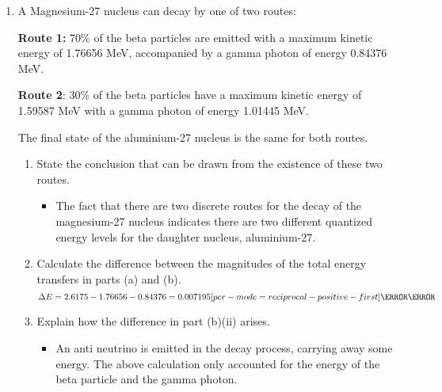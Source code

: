 \documentclass[a4paper,12pt]{article}
\let\oldsi\si
\renewcommand{\si}[1]{\oldsi[per-mode=reciprocal-positive-first]{#1}}
\begin{document}
\begin{enumerate}[resume*]
  \item A Magnesium-27 nucleus can decay by one of two routes:

        \textbf{Route 1:} 70\% of the beta particles are emitted with a maximum kinetic energy of
        1.76656 MeV, accompanied by a gamma photon of energy 0.84376 MeV.

        \textbf{Route 2}: 30\% of the beta particles have a maximum kinetic energy of 1.59587 MeV
        with a gamma photon of energy 1.01445 MeV.

        The final state of the aluminium-27 nucleus is the same for both routes.
        \begin{enumerate}[label=(\roman*)]
          \item State the conclusion that can be drawn from the existence of these two routes.
                \begin{itemize}
                  \item The fact that there are two discrete routes for the decay of the magnesium-27 nucleus indicates there are two different quantized energy levels for the daughter nucleus, aluminium-27.
                \end{itemize}
          \item Calculate the difference between the magnitudes of the total energy transfers in parts (a) and (b).
                $$\Delta E =2.6175 - 1.76656 - 0.84376 = 0.007195 \si{\mega\electronvolt}$$
          \item Explain how the difference in part (b)(ii) arises.
                \begin{itemize}
                  \item An anti neutrino is emitted in the decay process, carrying away some energy. The above calculation only accounted for the energy of the beta particle and the gamma photon.
                \end{itemize}


\end{enumerate}
\end{enumerate}
\end{document}
